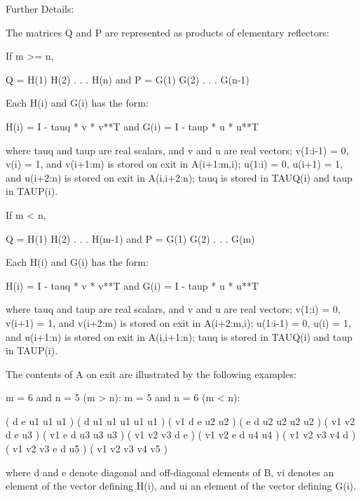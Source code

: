 \begin{DoxyParagraph}{Further Details\+: }
\begin{DoxyVerb}  The matrices Q and P are represented as products of elementary
  reflectors:

  If m >= n,

     Q = H(1) H(2) . . . H(n)  and  P = G(1) G(2) . . . G(n-1)

  Each H(i) and G(i) has the form:

     H(i) = I - tauq * v * v**T  and G(i) = I - taup * u * u**T

  where tauq and taup are real scalars, and v and u are real vectors;
  v(1:i-1) = 0, v(i) = 1, and v(i+1:m) is stored on exit in A(i+1:m,i);
  u(1:i) = 0, u(i+1) = 1, and u(i+2:n) is stored on exit in A(i,i+2:n);
  tauq is stored in TAUQ(i) and taup in TAUP(i).

  If m < n,

     Q = H(1) H(2) . . . H(m-1)  and  P = G(1) G(2) . . . G(m)

  Each H(i) and G(i) has the form:

     H(i) = I - tauq * v * v**T  and G(i) = I - taup * u * u**T

  where tauq and taup are real scalars, and v and u are real vectors;
  v(1:i) = 0, v(i+1) = 1, and v(i+2:m) is stored on exit in A(i+2:m,i);
  u(1:i-1) = 0, u(i) = 1, and u(i+1:n) is stored on exit in A(i,i+1:n);
  tauq is stored in TAUQ(i) and taup in TAUP(i).

  The contents of A on exit are illustrated by the following examples:

  m = 6 and n = 5 (m > n):          m = 5 and n = 6 (m < n):

    (  d   e   u1  u1  u1 )           (  d   u1  u1  u1  u1  u1 )
    (  v1  d   e   u2  u2 )           (  e   d   u2  u2  u2  u2 )
    (  v1  v2  d   e   u3 )           (  v1  e   d   u3  u3  u3 )
    (  v1  v2  v3  d   e  )           (  v1  v2  e   d   u4  u4 )
    (  v1  v2  v3  v4  d  )           (  v1  v2  v3  e   d   u5 )
    (  v1  v2  v3  v4  v5 )

  where d and e denote diagonal and off-diagonal elements of B, vi
  denotes an element of the vector defining H(i), and ui an element of
  the vector defining G(i).\end{DoxyVerb}
 
\end{DoxyParagraph}
\hypertarget{group__doubleGEcomputational_ga9c735b94f840f927f8085fd23f3ee2e6}{}
